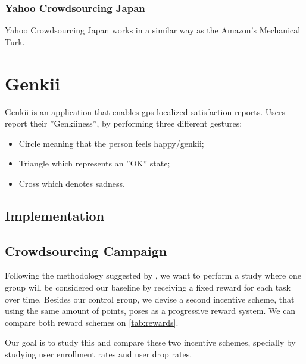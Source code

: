 \documentclass[letterpaper]{article}
\begin{document}
\subsubsection{Yahoo Crowdsourcing Japan}

Yahoo Crowdsourcing Japan works in a similar way as the Amazon's Mechanical Turk. 


\section{Genkii}


Genkii is an application that enables gps localized satisfaction reports. Users report their ''Genkiiness'', by performing three different gestures:

\begin{itemize}
	\item Circle meaning that the person feels happy/genkii;
	\item Triangle which represents an ''OK'' state;
	\item Cross which denotes sadness.
\end{itemize}





\subsection{Implementation}
\label{subsec:implementation}



\subsection{Crowdsourcing Campaign}



Following the methodology suggested by \cite{Choi2014}, we want to perform a study where one group will be considered our baseline by receiving a fixed reward for each task over time.
Besides our control group, we devise a second incentive scheme, that using the same amount of points, poses as a progressive reward system. We can compare both reward schemes on \ref{tab:rewards}.

Our goal is to study this and compare these two incentive schemes, specially by studying user enrollment rates and user drop rates.
\end{document}
